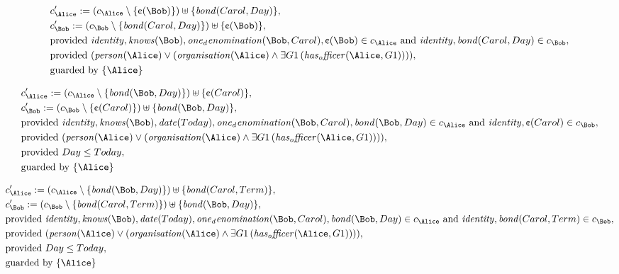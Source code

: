 \begin{align*}
&
c'_
{
\Alice
}
 := 
(c_
{
\Alice
}
 \setminus 
\{
\text{\textcent}
(
\Bob
)
\}
) \uplus 
\{
\mathit{
bond
}
(
Carol
,
Day
)
\}
,\\
&
c'_
{
\Bob
}
 := 
(c_
{
\Bob
}
 \setminus 
\{
\mathit{
bond
}
(
Carol
,
Day
)
\}
) \uplus 
\{
\text{\textcent}
(
\Bob
)
\}
,\\
&
\text{provided } 
\mathit{
identity
}
,
\mathit{
knows
}
(
\Bob
)
,
\mathit{
one_denomination
}
(
\Bob
,
Carol
)
,
\text{\textcent}
(
\Bob
)
 \in c_
{
\Alice
}
 \text{ and } 
\mathit{
identity
}
,
\mathit{
bond
}
(
Carol
,
Day
)
 \in c_
{
\Bob
}
,\\
&
\text{provided } 
(
\mathit{
person
}
(
\Alice
)
\lor
(
\mathit{
organisation
}
(
\Alice
)
\land
\exists 
G1
\,(
\mathit{
has_officer
}
(
\Alice
,
G1
)
)
)
)
,\\
&
\text{guarded by } \{
\Alice
\}
\end{align*}

\begin{align*}
&
c'_
{
\Alice
}
 := 
(c_
{
\Alice
}
 \setminus 
\{
\mathit{
bond
}
(
\Bob
,
Day
)
\}
) \uplus 
\{
\text{\textcent}
(
Carol
)
\}
,\\
&
c'_
{
\Bob
}
 := 
(c_
{
\Bob
}
 \setminus 
\{
\text{\textcent}
(
Carol
)
\}
) \uplus 
\{
\mathit{
bond
}
(
\Bob
,
Day
)
\}
,\\
&
\text{provided } 
\mathit{
identity
}
,
\mathit{
knows
}
(
\Bob
)
,
\mathit{
date
}
(
Today
)
,
\mathit{
one_denomination
}
(
\Bob
,
Carol
)
,
\mathit{
bond
}
(
\Bob
,
Day
)
 \in c_
{
\Alice
}
 \text{ and } 
\mathit{
identity
}
,
\text{\textcent}
(
Carol
)
 \in c_
{
\Bob
}
,\\
&
\text{provided } 
(
\mathit{
person
}
(
\Alice
)
\lor
(
\mathit{
organisation
}
(
\Alice
)
\land
\exists 
G1
\,(
\mathit{
has_officer
}
(
\Alice
,
G1
)
)
)
)
,\\
&
\text{provided } 
Day
\le
Today
,\\
&
\text{guarded by } \{
\Alice
\}
\end{align*}

\begin{align*}
&
c'_
{
\Alice
}
 := 
(c_
{
\Alice
}
 \setminus 
\{
\mathit{
bond
}
(
\Bob
,
Day
)
\}
) \uplus 
\{
\mathit{
bond
}
(
Carol
,
Term
)
\}
,\\
&
c'_
{
\Bob
}
 := 
(c_
{
\Bob
}
 \setminus 
\{
\mathit{
bond
}
(
Carol
,
Term
)
\}
) \uplus 
\{
\mathit{
bond
}
(
\Bob
,
Day
)
\}
,\\
&
\text{provided } 
\mathit{
identity
}
,
\mathit{
knows
}
(
\Bob
)
,
\mathit{
date
}
(
Today
)
,
\mathit{
one_denomination
}
(
\Bob
,
Carol
)
,
\mathit{
bond
}
(
\Bob
,
Day
)
 \in c_
{
\Alice
}
 \text{ and } 
\mathit{
identity
}
,
\mathit{
bond
}
(
Carol
,
Term
)
 \in c_
{
\Bob
}
,\\
&
\text{provided } 
(
\mathit{
person
}
(
\Alice
)
\lor
(
\mathit{
organisation
}
(
\Alice
)
\land
\exists 
G1
\,(
\mathit{
has_officer
}
(
\Alice
,
G1
)
)
)
)
,\\
&
\text{provided } 
Day
\le
Today
,\\
&
\text{guarded by } \{
\Alice
\}
\end{align*}
